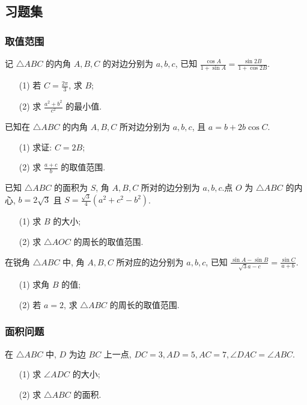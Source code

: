 \subsection{习题集}
\subsubsection{取值范围}
\begin{exercise}[2022 年全国新高考 I 卷第 18 题]
	记 $\triangle ABC$ 的内角 $A,B,C$ 的对边分别为 $a,b,c$, 已知 $\frac{\cos A}{1+\sin A} = \frac{\sin 2B}{1+\cos 2B}$.
	\begin{enumerate}
		\item[(1)] 若 $C = \frac{2\pi}{3}$, 求 $B$;
		\item[(2)] 求 $\frac{a^2+b^2}{c^2}$ 的最小值.
	\end{enumerate}
\end{exercise}

\begin{exercise}[2023 年衡水中学第三次综合素养评价第 18 题]
	已知在 $\triangle ABC$ 的内角 $A,B,C$ 所对边分别为 $a,b,c$, 且 $a=b+2b\cos C$.
	\begin{enumerate}
		\item[(1)] 求证: $C=2B$;
		\item[(2)] 求 $\frac{a+c}{b}$ 的取值范围.
	\end{enumerate}
\end{exercise}

\begin{exercise}
	已知 $\triangle ABC$ 的面积为 $S$, 角 $A,B,C$ 所对的边分别为 $a,b,c$.点 $O$ 为 $\triangle ABC$ 的内心, $b = 2\sqrt{3}$ 且 $S = \frac{\sqrt{3}}{4}(a^2+c^2-b^2)$.
	\begin{enumerate}
		\item[(1)] 求 $B$ 的大小;
		\item[(2)] 求 $\triangle AOC$ 的周长的取值范围.
	\end{enumerate}
\end{exercise}

\begin{exercise}
	在锐角 $\triangle ABC$ 中, 角 $A, B, C$ 所对应的边分别为 $a, b, c$, 已知 $\frac{\sin A - \sin B}{\sqrt{3}a - c} = \frac{\sin C}{a+b}$.
	\begin{enumerate}
		\item[(1)] 求角 $B$ 的值;
		\item[(2)] 若 $a=2$, 求 $\triangle ABC$ 的周长的取值范围.
	\end{enumerate}
\end{exercise}

\subsubsection{面积问题}
\begin{exercise}[2023 浙江省十校联盟第三次联考第 18 题]
	在 $\triangle ABC$ 中, $D$ 为边 $BC$ 上一点, $DC = 3, AD = 5, AC = 7, \angle DAC = \angle ABC$.
	\begin{enumerate}
		\item[(1)] 求 $\angle ADC$ 的大小;
		\item[(2)] 求 $\triangle ABC$ 的面积.
	\end{enumerate}
\end{exercise}